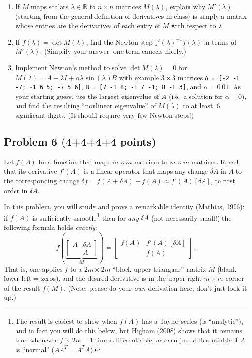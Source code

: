 \documentclass[10pt,oneside]{article}
\begin{document}
\begin{enumerate}

\item If $M$ maps scalars $\lambda \in \mathbb{R}$ to $n\times n$ matrices $M(\lambda)$, explain why $M'(\lambda)$ (starting from the general definition of derivatives in class) is simply a matrix whose entries are the derivatives of each entry of $M$ with respect to $\lambda$.

\item If $f(\lambda) = \det M(\lambda)$, find the Newton step $f'(\lambda)^{-1} f(\lambda)$ in terms of $M'(\lambda)$.  (Simplify your answer: one term cancels nicely.)

\item Implement Newton's method to solve $\det M(\lambda) = 0$ for $M(\lambda) = A - \lambda I + \alpha \lambda \sin(\lambda) B$ with example $3\times 3$ matrices \texttt{A = [-2 -1 -7; -1 6 5; -7 5 6]}, \texttt{B = [7 -1 8; -1 7 -1; 8 -1 3]}, and $\alpha = 0.01$.  As your starting guess, use the largest eigenvalue of $A$ (i.e.~a solution for $\alpha = 0$), and find the resulting ``nonlinear eigenvalue'' of $M(\lambda)$ to at least~6 significant digits.  (It should require very few Newton steps!)

\end{enumerate}




 
\subsection*{Problem 6 (4+4+4+4 points)}

Let $f(A)$ be a function that maps $m \times m$ matrices to $m \times m$ matrices.  Recall that its derivative $f'(A)$ is a linear operator that maps any change $\delta A$ in $A$ to the corresponding change $\delta f = f(A+\delta A) - f(A) \approx f'(A)[\delta A]$, to first order in $\delta A$.

In this problem, you will study and prove a remarkable identity (Mathias, 1996): if $f(A)$ is sufficiently smooth,\footnote{The result is easiest to show when $f(A)$ has a Taylor series (is ``analytic''), and in fact you will do this below, but Higham (2008) shows that it remains true whenever $f$ is $2m-1$ times differentiable, or even just differentiable if $A$ is ``normal'' ($AA^T = A^T A$).} then for \emph{any} 
$\delta A$ (not necessarily small!) the following formula holds \emph{exactly}:
$$
f\left(\underbrace{\begin{bmatrix} A & \delta A \\ & A \end{bmatrix}}_M\right) = \begin{bmatrix} f(A) & f'(A)[\delta A] \\ & f(A) \end{bmatrix} \, .
$$
That is, one applies $f$ to a $2m \times 2m$ ``block upper-trianguar'' matrix $M$ (blank lower-left = zeros), and the desired derivative is in the upper-right $m \times m$ corner of the result $f(M)$.  (Note: please do your \emph{own} derivation here, don't just look it up.)
\end{document}
